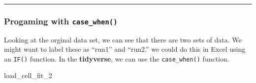 \documentclass[]{book}
\newenvironment{Shaded}{\begin{snugshade}}{\end{snugshade}}
\newcommand{\DecValTok}[1]{\textcolor[rgb]{0.00,0.00,0.81}{#1}}
\newcommand{\NormalTok}[1]{#1}
\theoremstyle{definition}
\theoremstyle{definition}
\theoremstyle{definition}
\theoremstyle{remark}
\begin{document}
\begin{center}\rule{0.5\linewidth}{\linethickness}\end{center}

\hypertarget{progaming-with-case_when}{%
\subsubsection{\texorpdfstring{Progaming with
\texttt{case\_when()}}{Progaming with case\_when()}}\label{progaming-with-case_when}}

Looking at the orginal data set, we can see that there are two sets of
data. We might want to label these as ``run1'' and ``run2.'' we could do
this in Excel using an \texttt{IF()} function. In the
\textbf{tidyverse}, we can use the \texttt{case\_when()} function.

\begin{Shaded}
\begin{Highlighting}[]
\NormalTok{load_cell_fit_}\DecValTok{2}
\end{Highlighting}
\end{Shaded}
\end{document}
